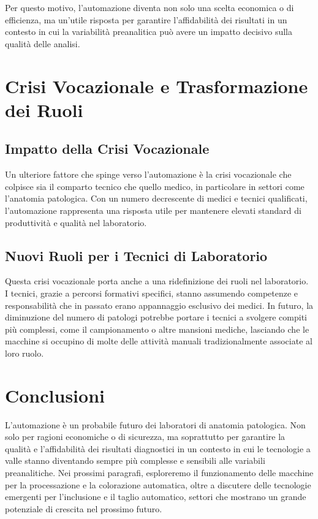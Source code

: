 Per questo motivo, l'automazione diventa non solo una scelta economica o di efficienza, ma un'utile risposta per garantire l'affidabilità dei risultati in un contesto in cui la variabilità preanalitica può avere un impatto decisivo sulla qualità delle analisi.

\section{Crisi Vocazionale e Trasformazione dei Ruoli}

\subsection{Impatto della Crisi Vocazionale}

Un ulteriore fattore che spinge verso l'automazione è la crisi vocazionale che colpisce sia il comparto tecnico che quello medico, in particolare in settori come l'anatomia patologica. Con un numero decrescente di medici e tecnici qualificati, l'automazione rappresenta una risposta utile per mantenere elevati standard di produttività e qualità nel laboratorio.

\subsection{Nuovi Ruoli per i Tecnici di Laboratorio}

Questa crisi vocazionale porta anche a una ridefinizione dei ruoli nel laboratorio. I tecnici, grazie a percorsi formativi specifici, stanno assumendo competenze e responsabilità che in passato erano appannaggio esclusivo dei medici. In futuro, la diminuzione del numero di patologi potrebbe portare i tecnici a svolgere compiti più complessi, come il campionamento o altre mansioni mediche, lasciando che le macchine si occupino di molte delle attività manuali tradizionalmente associate al loro ruolo.

\section{Conclusioni}

L'automazione è un probabile futuro dei laboratori di anatomia patologica. Non solo per ragioni economiche o di sicurezza, ma soprattutto per garantire la qualità e l'affidabilità dei risultati diagnostici in un contesto in cui le tecnologie a valle stanno diventando sempre più complesse e sensibili alle variabili preanalitiche. Nei prossimi paragrafi, esploreremo il funzionamento delle macchine per la processazione e la colorazione automatica, oltre a discutere delle tecnologie emergenti per l'inclusione e il taglio automatico, settori che mostrano un grande potenziale di crescita nel prossimo futuro.